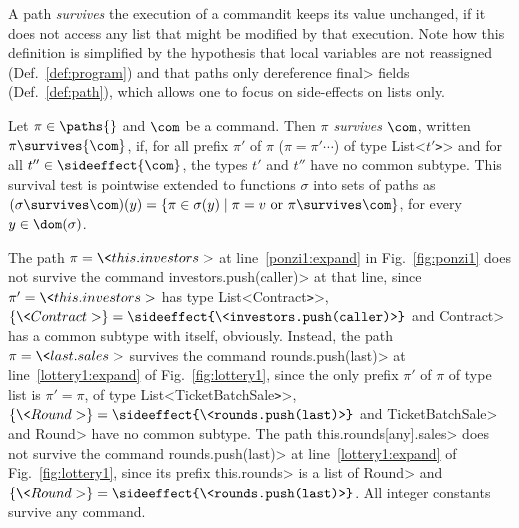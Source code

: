 A path \emph{survives} the execution of a command\ie it keeps its value unchanged,
if it does not access any list that might be modified by that execution. Note how this
definition is simplified by the hypothesis that local variables are not reassigned
(Def.~\ref{def:program}) and that paths only dereference
\<final> fields (Def.~\ref{def:path}), which allows one to focus
on side-effects on lists only.
%
\begin{definition}\label{def:survival}
  Let $\pi\in\paths{}$ and $\com$ be a command. Then
  \emph{$\pi$ survives $\com$}, written $\pi\survives{\com}$, if, for all prefix $\pi'$ of $\pi$
  (\ieinitial  $\pi=\pi'\cdots$) of type \<List<$t'$\texttt{>}>
  and for all $t''\in\sideeffect{\com}$, the types
  $t'$ and $t''$ have no common subtype.
  This survival test is pointwise extended to functions $\sigma$ into sets of paths as
  $(\sigma\survives\com)(y)=\{\pi\in\sigma(y)\mid\pi=v\text{ or }\pi\survives\com\}$, for every $y\in\dom(\sigma)$. 
\end{definition}
%
\begin{example}
The path $\pi=\<this.investors>$ at
line~\ref{ponzi1:expand} in Fig.~\ref{fig:ponzi1} does not survive
the command \<investors.push(caller)> at that line, since $\pi'=\<this.investors>$
has type \<List<Contract\texttt{>}>,
$\{\<Contract>\}=\sideeffect{\<investors.push(caller)>}$
and \<Contract> has a common subtype with itself, obviously.
Instead, the path $\pi=\<last.sales>$
survives the command \<rounds.push(last)>
at line~\ref{lottery1:expand} of Fig.~\ref{fig:lottery1}, since
the only prefix $\pi'$ of $\pi$ of type list is $\pi'=\pi$, of type
\<List<TicketBatchSale\texttt{>}>,
$\{\<Round>\}=\sideeffect{\<rounds.push(last)>}$ and
\<TicketBatchSale> and \<Round> have no common subtype.
The path \<this.rounds[any].sales> does not survive the command \<rounds.push(last)>
at line~\ref{lottery1:expand} of Fig.~\ref{fig:lottery1}, since
its prefix \<this.rounds> is a list of \<Round> and
$\{\<Round>\}=\sideeffect{\<rounds.push(last)>}$.
All integer constants survive any command.
\end{example}

